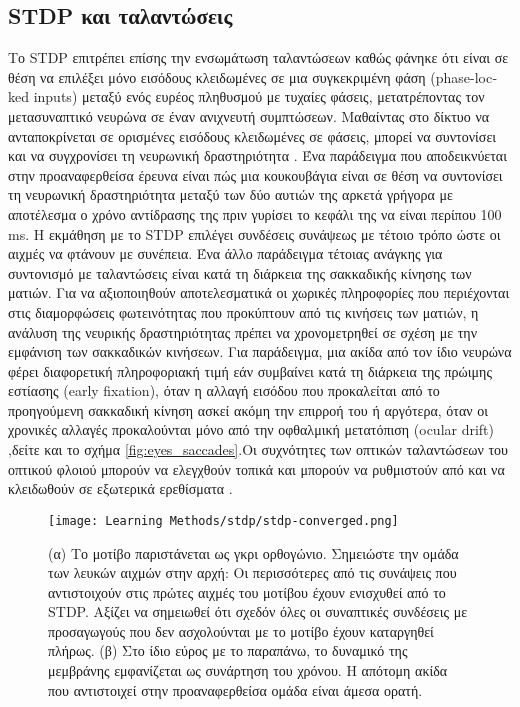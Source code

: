 \documentclass[12pt]{report}
\begin{document}
\subsection{\textlatin{STDP} και ταλαντώσεις}
Το \textlatin{STDP} επιτρέπει επίσης την ενσωμάτωση ταλαντώσεων καθώς φάνηκε ότι είναι σε θέση να επιλέξει μόνο εισόδους κλειδωμένες σε μια συγκεκριμένη φάση (\textlatin{phase-locked inputs}) μεταξύ ενός ευρέος πληθυσμού με τυχαίες φάσεις, μετατρέποντας τον μετασυναπτικό νευρώνα σε έναν ανιχνευτή συμπτώσεων. Μαθαίντας στο δίκτυο να ανταποκρίνεται σε ορισμένες εισόδους κλειδωμένες σε φάσεις, μπορεί να συντονίσει και να συγχρονίσει τη νευρωνική δραστηριότητα \cite{Gerstner1996}. Ένα παράδειγμα που αποδεικνύεται στην προαναφερθείσα έρευνα είναι πώς μια κουκουβάγια είναι σε θέση να συντονίσει τη νευρωνική δραστηριότητα μεταξύ των δύο αυτιών της αρκετά γρήγορα με αποτέλεσμα ο χρόνο αντίδρασης της πριν γυρίσει το κεφάλι της να είναι περίπου 100 \textlatin{ms}. Η εκμάθηση με το \textlatin{STDP} επιλέγει συνδέσεις συνάψεως με τέτοιο τρόπο ώστε οι αιχμές να φτάνουν με συνέπεια. Ένα άλλο παράδειγμα τέτοιας ανάγκης για συντονισμό με ταλαντώσεις είναι κατά τη διάρκεια της σακκαδικής κίνησης των ματιών. Για να αξιοποιηθούν αποτελεσματικά οι χωρικές πληροφορίες που περιέχονται στις διαμορφώσεις φωτεινότητας που προκύπτουν από τις κινήσεις των ματιών, η ανάλυση της νευρικής δραστηριότητας πρέπει να χρονομετρηθεί σε σχέση με την εμφάνιση των σακκαδικών κινήσεων. Για παράδειγμα, μια ακίδα από τον ίδιο νευρώνα φέρει διαφορετική πληροφοριακή τιμή εάν συμβαίνει κατά τη διάρκεια της πρώιμης εστίασης (\textlatin{early fixation}), όταν η αλλαγή εισόδου που προκαλείται από το προηγούμενη σακκαδική κίνηση ασκεί ακόμη την επιρροή του ή αργότερα, όταν οι χρονικές αλλαγές προκαλούνται μόνο από την οφθαλμική μετατόπιση (\textlatin{ocular drift})  \cite{Rucci2018 },δείτε και το σχήμα \ref{fig:eyes_saccades}.Οι συχνότητες των οπτικών ταλαντώσεων του οπτικού φλοιού μπορούν να ελεγχθούν τοπικά και μπορούν να ρυθμιστούν από και να κλειδωθούν σε εξωτερικά ερεθίσματα \cite{Ahissar2012}.

\begin{figure}[htp]
    \centering
    \texttt{[image: Learning Methods/stdp/stdp-converged.png]}
    \caption{(α) Το μοτίβο παριστάνεται ως γκρι ορθογώνιο. Σημειώστε την ομάδα των λευκών αιχμών στην αρχή: Οι περισσότερες από τις συνάψεις που αντιστοιχούν στις πρώτες αιχμές του μοτίβου έχουν ενισχυθεί από το STDP. Αξίζει να σημειωθεί ότι σχεδόν όλες οι συναπτικές συνδέσεις με προσαγωγούς που δεν ασχολούνται με το μοτίβο έχουν καταργηθεί πλήρως. (β) Στο ίδιο εύρος με το παραπάνω, το δυναμικό της μεμβράνης εμφανίζεται ως συνάρτηση του χρόνου. Η απότομη ακίδα που αντιστοιχεί στην προαναφερθείσα ομάδα είναι άμεσα ορατή\cite{Masquelier2008}.} 
    \label{fig:stdp-converged}
\end{figure}
\end{document}

